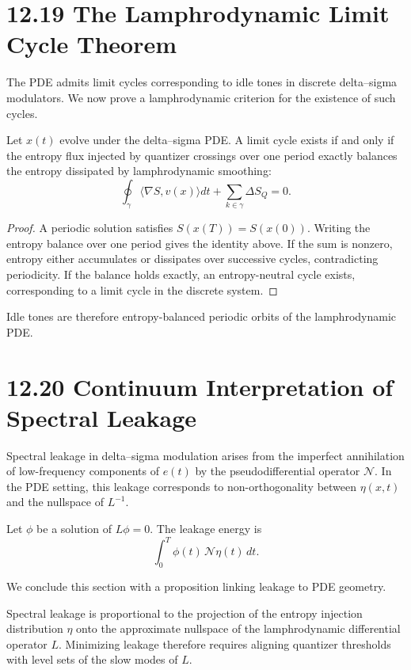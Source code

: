 \section*{12.19 The Lamphrodynamic Limit Cycle Theorem}

The PDE admits limit cycles corresponding to idle tones in discrete delta--sigma modulators. We now prove a lamphrodynamic criterion for the existence of such cycles.

\begin{theorem}
Let $x(t)$ evolve under the delta--sigma PDE. A limit cycle exists if and only if the entropy flux injected by quantizer crossings over one period exactly balances the entropy dissipated by lamphrodynamic smoothing:
\[
\oint_{\gamma} \langle \nabla S, v(x) \rangle dt + \sum_{k \in \gamma} \Delta S_{Q} = 0.
\]
\end{theorem}

\begin{proof}
A periodic solution satisfies $S(x(T)) = S(x(0))$. Writing the entropy balance over one period gives the identity above. If the sum is nonzero, entropy either accumulates or dissipates over successive cycles, contradicting periodicity. If the balance holds exactly, an entropy-neutral cycle exists, corresponding to a limit cycle in the discrete system.
\end{proof}

Idle tones are therefore entropy-balanced periodic orbits of the lamphrodynamic PDE.

\section*{12.20 Continuum Interpretation of Spectral Leakage}

Spectral leakage in delta--sigma modulation arises from the imperfect annihilation of low-frequency components of $e(t)$ by the pseudodifferential operator $\mathcal{N}$. In the PDE setting, this leakage corresponds to non-orthogonality between $\eta(x,t)$ and the nullspace of $L^{-1}$.

Let $\phi$ be a solution of $L \phi = 0$. The leakage energy is
\[
\int_{0}^{T} \phi(t) \, \mathcal{N} \eta(t) \, dt.
\]

We conclude this section with a proposition linking leakage to PDE geometry.

\begin{proposition}
Spectral leakage is proportional to the projection of the entropy injection distribution $\eta$ onto the approximate nullspace of the lamphrodynamic differential operator $L$. Minimizing leakage therefore requires aligning quantizer thresholds with level sets of the slow modes of $L$.
\end{proposition}

